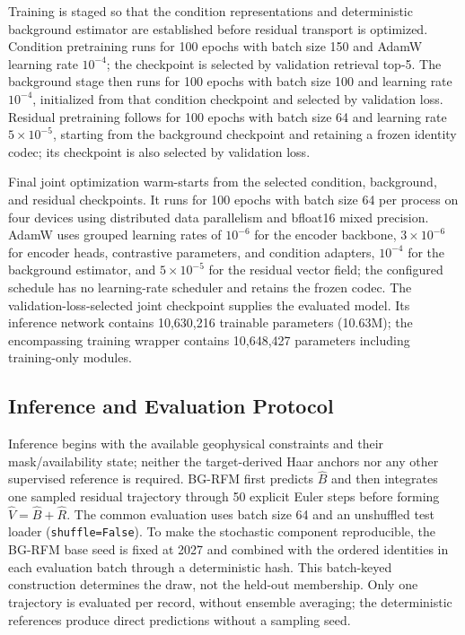Training is staged so that the condition representations and deterministic background estimator are established before residual transport is optimized. Condition pretraining runs for 100 epochs with batch size 150 and AdamW learning rate $10^{-4}$; the checkpoint is selected by validation retrieval top-5. The background stage then runs for 100 epochs with batch size 100 and learning rate $10^{-4}$, initialized from that condition checkpoint and selected by validation loss. Residual pretraining follows for 100 epochs with batch size 64 and learning rate $5\times10^{-5}$, starting from the background checkpoint and retaining a frozen identity codec; its checkpoint is also selected by validation loss.

Final joint optimization warm-starts from the selected condition, background, and residual checkpoints. It runs for 100 epochs with batch size 64 per process on four devices using distributed data parallelism and bfloat16 mixed precision. AdamW uses grouped learning rates of $10^{-6}$ for the encoder backbone, $3\times10^{-6}$ for encoder heads, contrastive parameters, and condition adapters, $10^{-4}$ for the background estimator, and $5\times10^{-5}$ for the residual vector field; the configured schedule has no learning-rate scheduler and retains the frozen codec. The validation-loss-selected joint checkpoint supplies the evaluated model. Its inference network contains 10,630,216 trainable parameters (10.63M); the encompassing training wrapper contains 10,648,427 parameters including training-only modules.

\subsection{Inference and Evaluation Protocol}\label{sec:methods-evaluation}

Inference begins with the available geophysical constraints and their mask/availability state; neither the target-derived Haar anchors nor any other supervised reference is required. BG-RFM first predicts $\hat B$ and then integrates one sampled residual trajectory through 50 explicit Euler steps before forming $\hat V=\hat B+\hat R$. The common evaluation uses batch size 64 and an unshuffled test loader (\texttt{shuffle=False}). To make the stochastic component reproducible, the BG-RFM base seed is fixed at 2027 and combined with the ordered identities in each evaluation batch through a deterministic hash. This batch-keyed construction determines the draw, not the held-out membership. Only one trajectory is evaluated per record, without ensemble averaging; the deterministic references produce direct predictions without a sampling seed.

